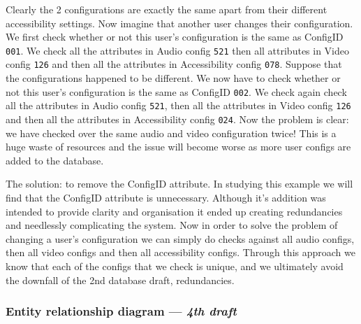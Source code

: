 Clearly the 2 configurations are exactly the same apart from
their different accessibility settings. Now imagine that
another user changes their configuration. We first check
whether or not this user's configuration is the same as
ConfigID \texttt{001}. We check all the attributes in Audio
config \texttt{521} then all attributes in Video config
\texttt{126} and then all the attributes in Accessibility config
\texttt{078}. Suppose that the configurations happened to be
different. We now have to check whether or not this user's
configuration is the same as ConfigID \texttt{002}. We check
again check all the attributes in Audio config \texttt{521},
then all the attributes in Video config \texttt{126} and then
all the attributes in Accessibility config \texttt{024}. Now
the problem is clear: we have checked over the same audio and
video configuration twice! This is a huge waste of resources and
the issue will become worse as more user configs are added to
the database. \\ \vspace{0.2cm}

The solution: to remove the ConfigID attribute. In studying this
example we will find that the ConfigID attribute is unnecessary.
Although it's addition was intended to provide clarity and
organisation it ended up creating redundancies and needlessly
complicating the system. Now in order to solve the problem of
changing a user's configuration we can simply do checks against
all audio configs, then all video configs and then all
accessibility configs. Through this approach we know that each
of the configs that we check is unique, and we ultimately avoid
the downfall of the 2nd database draft, redundancies.

\subsubsection{Entity relationship diagram — \textit{4th draft}}

